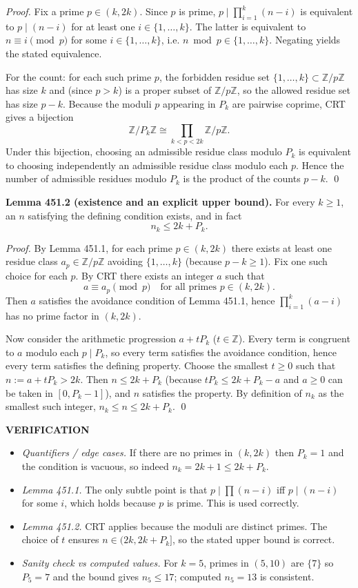 \emph{Proof.}
Fix a prime $p\in(k,2k)$. Since $p$ is prime, $p\mid\prod_{i=1}^k(n-i)$ is equivalent to $p\mid (n-i)$ for at least one $i\in\{1,\dots,k\}$. The latter is equivalent to $n\equiv i\pmod p$ for some $i\in\{1,\dots,k\}$, i.e. $n\bmod p\in\{1,\dots,k\}$. Negating yields the stated equivalence.

For the count: for each such prime $p$, the forbidden residue set $\{1,\dots,k\}\subset \mathbb Z/p\mathbb Z$ has size $k$ and (since $p>k$) is a proper subset of $\mathbb Z/p\mathbb Z$, so the allowed residue set has size $p-k$. Because the moduli $p$ appearing in $P_k$ are pairwise coprime, CRT gives a bijection
\[
\mathbb Z/P_k\mathbb Z \cong \prod_{k<p<2k} \mathbb Z/p\mathbb Z.
\]
Under this bijection, choosing an admissible residue class modulo $P_k$ is equivalent to choosing independently an admissible residue class modulo each $p$. Hence the number of admissible residues modulo $P_k$ is the product of the counts $p-k$.
\qed

\medskip

\textbf{Lemma 451.2 (existence and an explicit upper bound).}
For every $k\ge 1$, an $n$ satisfying the defining condition exists, and in fact
\[
 n_k\le 2k+P_k.
\]

\emph{Proof.}
By Lemma 451.1, for each prime $p\in(k,2k)$ there exists at least one residue class $a_p\in\mathbb Z/p\mathbb Z$ avoiding $\{1,\dots,k\}$ (because $p-k\ge 1$). Fix one such choice for each $p$. By CRT there exists an integer $a$ such that
\[
 a\equiv a_p\pmod p\quad\text{for all primes }p\in(k,2k).
\]
Then $a$ satisfies the avoidance condition of Lemma 451.1, hence $\prod_{i=1}^k(a-i)$ has no prime factor in $(k,2k)$.

Now consider the arithmetic progression $a+tP_k$ ($t\in\mathbb Z$). Every term is congruent to $a$ modulo each $p\mid P_k$, so every term satisfies the avoidance condition, hence every term satisfies the defining property.
Choose the smallest $t\ge 0$ such that $n:=a+tP_k>2k$. Then $n\le 2k+P_k$ (because $tP_k\le 2k+P_k-a$ and $a\ge 0$ can be taken in $[0,P_k-1]$), and $n$ satisfies the property. By definition of $n_k$ as the smallest such integer, $n_k\le n\le 2k+P_k$.
\qed

\medskip

\textbf{VERIFICATION}

\begin{itemize}
\item \emph{Quantifiers / edge cases.} If there are no primes in $(k,2k)$ then $P_k=1$ and the condition is vacuous, so indeed $n_k=2k+1\le 2k+P_k$.
\item \emph{Lemma 451.1.} The only subtle point is that $p\mid\prod (n-i)$ iff $p\mid (n-i)$ for some $i$, which holds because $p$ is prime. This is used correctly.
\item \emph{Lemma 451.2.} CRT applies because the moduli are distinct primes. The choice of $t$ ensures $n\in(2k,2k+P_k]$, so the stated upper bound is correct.
\item \emph{Sanity check vs computed values.} For $k=5$, primes in $(5,10)$ are $\{7\}$ so $P_5=7$ and the bound gives $n_5\le 17$; computed $n_5=13$ is consistent.
\end{itemize}

